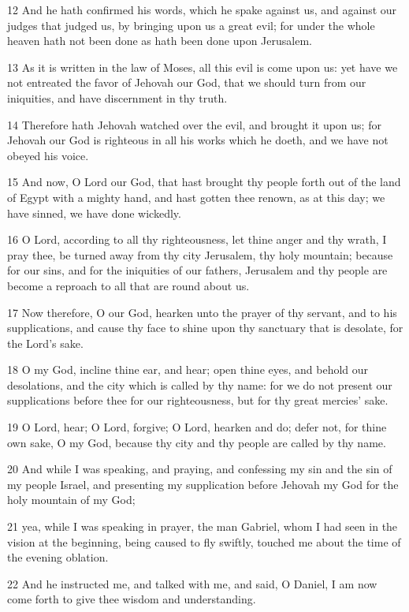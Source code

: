 \par 12 And he hath confirmed his words, which he spake against us, and against our judges that judged us, by bringing upon us a great evil; for under the whole heaven hath not been done as hath been done upon Jerusalem.
\par 13 As it is written in the law of Moses, all this evil is come upon us: yet have we not entreated the favor of Jehovah our God, that we should turn from our iniquities, and have discernment in thy truth.
\par 14 Therefore hath Jehovah watched over the evil, and brought it upon us; for Jehovah our God is righteous in all his works which he doeth, and we have not obeyed his voice.
\par 15 And now, O Lord our God, that hast brought thy people forth out of the land of Egypt with a mighty hand, and hast gotten thee renown, as at this day; we have sinned, we have done wickedly.
\par 16 O Lord, according to all thy righteousness, let thine anger and thy wrath, I pray thee, be turned away from thy city Jerusalem, thy holy mountain; because for our sins, and for the iniquities of our fathers, Jerusalem and thy people are become a reproach to all that are round about us.
\par 17 Now therefore, O our God, hearken unto the prayer of thy servant, and to his supplications, and cause thy face to shine upon thy sanctuary that is desolate, for the Lord's sake.
\par 18 O my God, incline thine ear, and hear; open thine eyes, and behold our desolations, and the city which is called by thy name: for we do not present our supplications before thee for our righteousness, but for thy great mercies' sake.
\par 19 O Lord, hear; O Lord, forgive; O Lord, hearken and do; defer not, for thine own sake, O my God, because thy city and thy people are called by thy name.
\par 20 And while I was speaking, and praying, and confessing my sin and the sin of my people Israel, and presenting my supplication before Jehovah my God for the holy mountain of my God;
\par 21 yea, while I was speaking in prayer, the man Gabriel, whom I had seen in the vision at the beginning, being caused to fly swiftly, touched me about the time of the evening oblation.
\par 22 And he instructed me, and talked with me, and said, O Daniel, I am now come forth to give thee wisdom and understanding.
